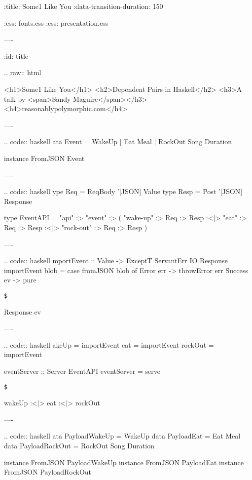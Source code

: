 :title: Some1 Like You
:data-transition-duration: 150

:css: fonts.css
:css: presentation.css

\newenvironment{hs}[1]{.. code:: haskell
}{}
\newenvironment{raw}[1]{.. raw:: html

  <pre>}{
  </pre>
}
\newcommand{\$}{\begin{verbatim}$\end{verbatim}}
\newcommand{\todo}[2]{#2}
\newcommand{\note}[1]{<span class="new">#1</span>}

----

:id: title

.. raw:: html

  <h1>Some1 Like You</h1>
  <h2>Dependent Pairs in Haskell</h2>
  <h3>A talk by <span>Sandy Maguire</span></h3>
  <h4>reasonablypolymorphic.com</h4>

----

\begin{hs}
  data Event = WakeUp
             | Eat Meal
             | RockOut Song Duration

  instance FromJSON Event
\end{hs}

----

\begin{hs}
  type Req  = ReqBody '[JSON] Value
  type Resp = Post    '[JSON] Response

  type EventAPI = "api" :> "event" :>
         ( "wake-up"  :> Req :> Resp
      :<|> "eat"      :> Req :> Resp
      :<|> "rock-out" :> Req :> Resp
         )
\end{hs}

----

\begin{hs}
  importEvent :: Value -> ExceptT ServantErr IO Response
  importEvent blob =
    case fromJSON blob of
      Error   err -> throwError err
      Success ev  -> pure \$ Response ev
\end{hs}

----

\begin{hs}
  wakeUp  = importEvent
  eat     = importEvent
  rockOut = importEvent

  eventServer :: Server EventAPI
  eventServer = serve \$
    wakeUp :<|> eat :<|> rockOut
\end{hs}

----

\begin{hs}
  data PayloadWakeUp  = \todo{rename these so they dont clash with datakinds later}{WakeUp}
  data PayloadEat     = Eat Meal
  data PayloadRockOut = RockOut Song Duration

  instance FromJSON PayloadWakeUp
  instance FromJSON PayloadEat
  instance FromJSON PayloadRockOut
\end{hs}

